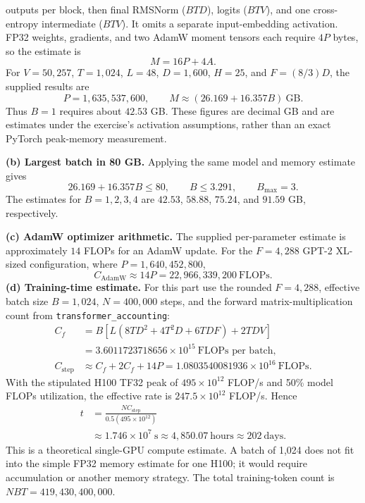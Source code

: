 \documentclass[10pt,letterpaper]{article}
\begin{document}
outputs per block, then final RMSNorm ($BTD$), logits ($BTV$), and one
cross-entropy intermediate ($BTV$). It omits a separate input-embedding
activation. FP32 weights, gradients, and two AdamW moment tensors each
require $4P$ bytes, so the estimate is
\[
M=16P+4A.
\]
For $V=50{,}257$, $T=1{,}024$, $L=48$, $D=1{,}600$, $H=25$, and
$F=(8/3)D$, the supplied results are
\[
P=1{,}635{,}537{,}600,\qquad
M\approx(26.169+16.357B)\ \mathrm{GB}.
\]
Thus $B=1$ requires about $42.53$ GB. These figures are decimal GB and
are estimates under the exercise's activation assumptions, rather than
an exact PyTorch peak-memory measurement.\par
\medskip
\textbf{(b) Largest batch in 80 GB.} Applying the same model and
memory estimate gives
\[
26.169+16.357B\leq80,
\qquad B\leq3.291,
\qquad \boxed{B_{\max}=3}.
\]
The estimates for $B=1,2,3,4$ are $42.53$, $58.88$, $75.24$, and
$91.59$ GB, respectively.\par
\medskip
\noindent\textbf{(c) AdamW optimizer arithmetic.} The supplied
per-parameter estimate is approximately $14$ FLOPs for an AdamW update.
For the $F=4{,}288$ GPT-2 XL-sized configuration, where
$P=1{,}640{,}452{,}800$,
\[
C_{\mathrm{AdamW}}\approx14P
=22{,}966{,}339{,}200\ \text{FLOPs}.
\]
\textbf{(d) Training-time estimate.} For this part use the rounded
$F=4{,}288$, effective batch size $B=1{,}024$, $N=400{,}000$ steps,
and the forward matrix-multiplication count from
\texttt{transformer\_accounting}:
\[
\begin{aligned}
C_f &= B\left[L(8TD^2+4T^2D+6TDF)+2TDV\right]\\
&=3.6011723718656\times10^{15}\ \text{FLOPs per batch},\\
C_{\mathrm{step}}&\approx C_f+2C_f+14P
=1.0803540081936\times10^{16}\ \text{FLOPs}.
\end{aligned}
\]
With the stipulated H100 TF32 peak of $495\times10^{12}$ FLOP/s and
50\% model FLOPs utilization, the effective rate is
$247.5\times10^{12}$ FLOP/s. Hence
\[
\begin{aligned}
t&=\frac{N C_{\mathrm{step}}}{0.5(495\times10^{12})}\\
&\approx 1.746\times10^{7}\ \mathrm{s}
\approx\boxed{4{,}850.07\ \mathrm{hours}}
\approx202\ \mathrm{days}.
\end{aligned}
\]
This is a theoretical single-GPU compute estimate. A batch of 1,024
does not fit into the simple FP32 memory estimate for one H100; it
would require accumulation or another memory strategy. The total
training-token count is $NBT=419{,}430{,}400{,}000$.\par
\end{document}
